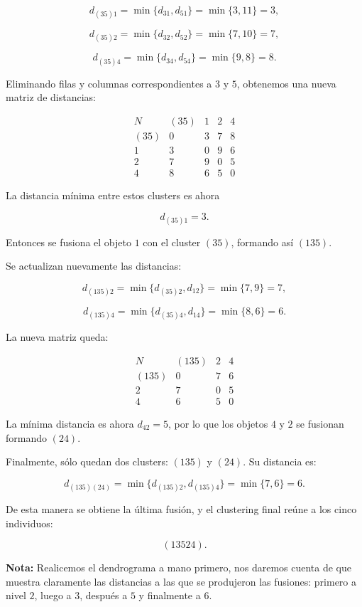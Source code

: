 \documentclass[
]{book}
\begin{document}
\[
d_{(35)1} = \min\{d_{31}, d_{51}\} = \min\{3, 11\} = 3,
\]

\[
d_{(35)2} = \min\{d_{32}, d_{52}\} = \min\{7, 10\} = 7,
\]

\[
d_{(35)4} = \min\{d_{34}, d_{54}\} = \min\{9, 8\} = 8.
\]

Eliminando filas y columnas correspondientes a \(3\) y \(5\), obtenemos una nueva matriz de distancias:

\[
\begin{array}{c|cccc}
N & (35) & 1 & 2 & 4 \\
\hline
(35) & 0 & 3 & 7 & 8 \\
1 & 3 & 0 & 9 & 6 \\
2 & 7 & 9 & 0 & 5 \\
4 & 8 & 6 & 5 & 0
\end{array}
\]

La distancia mínima entre estos clusters es ahora

\[
d_{(35)1} = 3.
\]

Entonces se fusiona el objeto \(1\) con el cluster \((35)\), formando así \((135)\).

Se actualizan nuevamente las distancias:

\[
d_{(135)2} = \min\{d_{(35)2}, d_{12}\} = \min\{7, 9\} = 7,
\]

\[
d_{(135)4} = \min\{d_{(35)4}, d_{14}\} = \min\{8, 6\} = 6.
\]

La nueva matriz queda:

\[
\begin{array}{c|ccc}
N & (135) & 2 & 4 \\
\hline
(135) & 0 & 7 & 6 \\
2 & 7 & 0 & 5 \\
4 & 6 & 5 & 0
\end{array}
\]

La mínima distancia es ahora \(d_{42} = 5\), por lo que los objetos \(4\) y \(2\) se fusionan formando \((24)\).

Finalmente, sólo quedan dos clusters: \((135)\) y \((24)\). Su distancia es:

\[
d_{(135)(24)} = \min\{d_{(135)2}, d_{(135)4}\} = \min\{7, 6\} = 6.
\]

De esta manera se obtiene la última fusión, y el clustering final reúne a los cinco individuos:

\[
(13524).
\]

\textbf{Nota:} Realicemos el dendrograma a mano primero, nos daremos cuenta de que muestra claramente las distancias a las que se produjeron las fusiones: primero a nivel \(2\), luego a \(3\), después a \(5\) y finalmente a \(6\).
\end{document}
